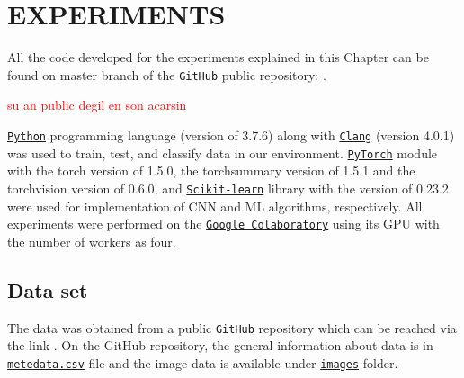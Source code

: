 \chapter{EXPERIMENTS}
\label{ch:CH5}

All the code developed for the experiments explained in this Chapter can be found on master branch of the \verb|GitHub| public repository: \newline
\textcolor{blue}{}.

\textcolor{red}{su an public degil en son acarsin}


\href{https://www.python.org/downloads/release/python-376/}{\texttt{Python}} programming language (version of 3.7.6) along with \href{https://releases.llvm.org/4.0.1/}{\texttt{Clang}} (version 4.0.1) was used to train, test, and classify data in our environment. \href{https://pytorch.org/get-started/previous-versions/#v150}{\texttt{PyTorch}} module with the torch version of 1.5.0, the torchsummary version of 1.5.1 and the torchvision version of 0.6.0, and \href{https://scikit-learn.org/stable/whats_new/v0.23.html}{\texttt{Scikit-learn}} library with the version of 0.23.2 were used for implementation of CNN and ML algorithms, respectively. All experiments were performed on the \href{https://colab.research.google.com/}{\texttt{Google Colaboratory}} using its GPU with the number of workers as four.

\section{Data set}

The data was obtained from a public \texttt{GitHub} repository which can be reached via the link \textcolor{blue}{}. On the GitHub repository, the general information about data is in \href{https://github.com/ieee8023/covid-chestxray-dataset/blob/master/metadata.csv}{\texttt{metedata.csv}} file and the image data is available under \href{https://github.com/ieee8023/covid-chestxray-dataset/tree/master/images}{\texttt{images}} folder.

